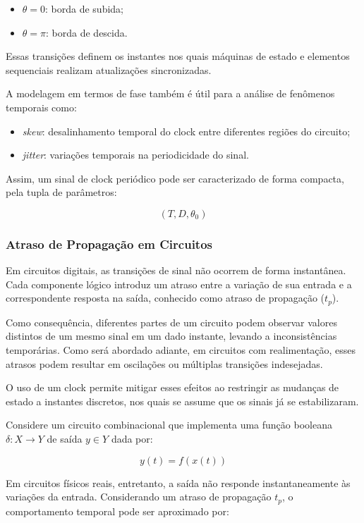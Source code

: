 \documentclass[a4paper,12pt]{article}
\begin{document}
\begin{itemize}
    \item \(\theta = 0\): borda de subida;
    \item \(\theta = \pi\): borda de descida.
\end{itemize}

Essas transições definem os instantes nos quais máquinas de estado e elementos sequenciais realizam atualizações sincronizadas.

A modelagem em termos de fase também é útil para a análise de fenômenos temporais como:

\begin{itemize}
    \item \textit{skew}: desalinhamento temporal do clock entre diferentes regiões do circuito;
    \item \textit{jitter}: variações temporais na periodicidade do sinal.
\end{itemize}

Assim, um sinal de clock periódico pode ser caracterizado de forma compacta, pela tupla de parâmetros:

\[
(T, D, \theta_0)
\]


\subsubsection{Atraso de Propagação em Circuitos}

Em circuitos digitais, as transições de sinal não ocorrem de forma instantânea. Cada componente lógico introduz um atraso entre a variação de sua entrada e a correspondente resposta na saída, conhecido como atraso de propagação ($t_p$).

Como consequência, diferentes partes de um circuito podem observar valores distintos de um mesmo sinal em um dado instante, levando a inconsistências temporárias. Como será abordado adiante, em circuitos com realimentação, esses atrasos podem resultar em oscilações ou múltiplas transições indesejadas.

O uso de um clock permite mitigar esses efeitos ao restringir as mudanças de estado a instantes discretos, nos quais se assume que os sinais já se estabilizaram.

Considere um circuito combinacional que implementa uma função booleana $\delta : X \rightarrow Y$ de saída $y \in Y$ dada por:

\[
y(t) = f(x(t))
\]

Em circuitos físicos reais, entretanto, a saída não responde instantaneamente às variações da entrada. Considerando um atraso de propagação \(t_p\), o comportamento temporal pode ser aproximado por:
\end{document}
